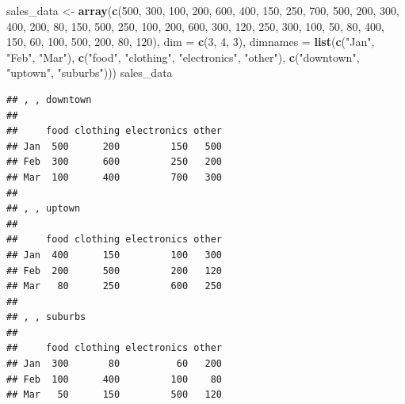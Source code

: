 \documentclass[
]{article}
\newenvironment{Shaded}{\begin{snugshade}}{\end{snugshade}}
\newcommand{\AttributeTok}[1]{\textcolor[rgb]{0.13,0.29,0.53}{#1}}
\newcommand{\DecValTok}[1]{\textcolor[rgb]{0.00,0.00,0.81}{#1}}
\newcommand{\FunctionTok}[1]{\textcolor[rgb]{0.13,0.29,0.53}{\textbf{#1}}}
\newcommand{\NormalTok}[1]{#1}
\newcommand{\OtherTok}[1]{\textcolor[rgb]{0.56,0.35,0.01}{#1}}
\newcommand{\StringTok}[1]{\textcolor[rgb]{0.31,0.60,0.02}{#1}}
\begin{document}
\begin{Shaded}
\begin{Highlighting}[]
\NormalTok{sales\_data }\OtherTok{\textless{}{-}} \FunctionTok{array}\NormalTok{(}\FunctionTok{c}\NormalTok{(}\DecValTok{500}\NormalTok{, }\DecValTok{300}\NormalTok{, }\DecValTok{100}\NormalTok{, }\DecValTok{200}\NormalTok{, }\DecValTok{600}\NormalTok{, }\DecValTok{400}\NormalTok{, }\DecValTok{150}\NormalTok{, }\DecValTok{250}\NormalTok{, }\DecValTok{700}\NormalTok{, }\DecValTok{500}\NormalTok{, }\DecValTok{200}\NormalTok{, }\DecValTok{300}\NormalTok{, }\DecValTok{400}\NormalTok{, }\DecValTok{200}\NormalTok{, }\DecValTok{80}\NormalTok{, }\DecValTok{150}\NormalTok{, }\DecValTok{500}\NormalTok{, }\DecValTok{250}\NormalTok{, }\DecValTok{100}\NormalTok{, }\DecValTok{200}\NormalTok{, }\DecValTok{600}\NormalTok{, }\DecValTok{300}\NormalTok{, }\DecValTok{120}\NormalTok{, }\DecValTok{250}\NormalTok{, }\DecValTok{300}\NormalTok{, }\DecValTok{100}\NormalTok{, }\DecValTok{50}\NormalTok{, }\DecValTok{80}\NormalTok{, }\DecValTok{400}\NormalTok{, }\DecValTok{150}\NormalTok{, }\DecValTok{60}\NormalTok{, }\DecValTok{100}\NormalTok{, }\DecValTok{500}\NormalTok{, }\DecValTok{200}\NormalTok{, }\DecValTok{80}\NormalTok{, }\DecValTok{120}\NormalTok{), }\AttributeTok{dim =} \FunctionTok{c}\NormalTok{(}\DecValTok{3}\NormalTok{, }\DecValTok{4}\NormalTok{, }\DecValTok{3}\NormalTok{), }\AttributeTok{dimnames =} \FunctionTok{list}\NormalTok{(}\FunctionTok{c}\NormalTok{(}\StringTok{"Jan"}\NormalTok{, }\StringTok{"Feb"}\NormalTok{, }\StringTok{"Mar"}\NormalTok{), }\FunctionTok{c}\NormalTok{(}\StringTok{"food"}\NormalTok{, }\StringTok{"clothing"}\NormalTok{, }\StringTok{"electronics"}\NormalTok{, }\StringTok{"other"}\NormalTok{), }\FunctionTok{c}\NormalTok{(}\StringTok{"downtown"}\NormalTok{, }\StringTok{"uptown"}\NormalTok{, }\StringTok{"suburbs"}\NormalTok{)))}
\NormalTok{sales\_data}
\end{Highlighting}
\end{Shaded}

\begin{verbatim}
## , , downtown
## 
##     food clothing electronics other
## Jan  500      200         150   500
## Feb  300      600         250   200
## Mar  100      400         700   300
## 
## , , uptown
## 
##     food clothing electronics other
## Jan  400      150         100   300
## Feb  200      500         200   120
## Mar   80      250         600   250
## 
## , , suburbs
## 
##     food clothing electronics other
## Jan  300       80          60   200
## Feb  100      400         100    80
## Mar   50      150         500   120
\end{verbatim}
\end{document}
